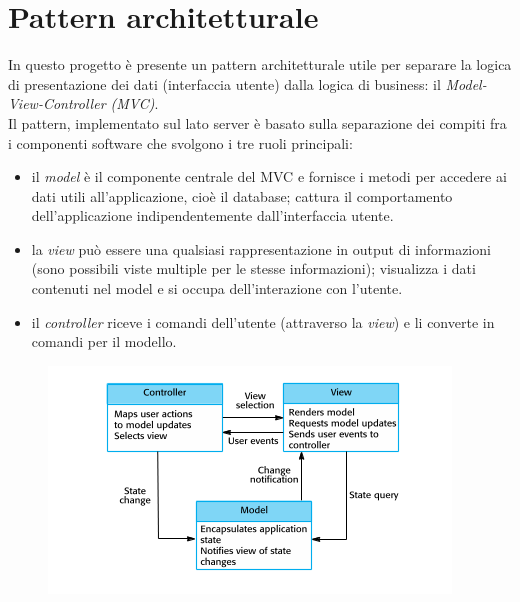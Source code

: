 \documentclass[a4paper,12pt]{report}
\begin{document}
	
	
	\chapter*{Pattern architetturale}
	In questo progetto è presente un pattern architetturale utile per separare la logica di presentazione dei dati (interfaccia utente) dalla logica di business: il \textit{Model-View-Controller (MVC)}.\\
	Il pattern, implementato sul lato server è basato sulla separazione dei compiti fra i componenti software che svolgono i tre ruoli principali:
	\begin{itemize}
	\item il \textit{model} è il componente centrale del MVC e fornisce i metodi per accedere ai dati utili all'applicazione, cioè il database; cattura il comportamento dell'applicazione indipendentemente dall'interfaccia utente.
	\item la \textit{view} può essere una qualsiasi rappresentazione in output di informazioni (sono possibili viste multiple per le stesse informazioni); visualizza i dati contenuti nel model e si occupa dell'interazione con l'utente.
	\item il \textit{controller} riceve i comandi dell'utente (attraverso la \textit{view}) e li converte in comandi per il modello.
	\end{itemize}
	\begin{figure}[h]
		\centering
		\includegraphics[scale=0.94]{MVC}
	\end{figure}



		
	
	
\end{document}
